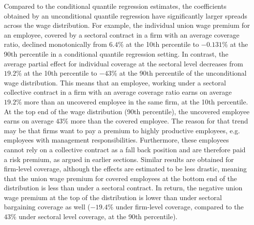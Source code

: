 Compared to the conditional quantile regression estimates, the coefficients obtained by an unconditional quantile regression have significantly larger spreads across the wage distribution. For example, the individual union wage premium for an employee, covered by a sectoral contract in a firm with an average coverage ratio, declined monotonically from $6.4\%$ at the 10th percentile to $-0.131\%$ at the 90th percentile in a conditional quantile regression setting. In contrast, the average partial effect for individual coverage at the sectoral level decreases from $19.2\%$ at the 10th percentile to $-43\%$ at the 90th percentile of the unconditional wage distribution. This means that an employee, working under a sectoral collective contract in a firm with an average coverage ratio earns on average $19.2\%$ more than an uncovered employee in the same firm, at the 10th percentile. At the top end of the wage distribution (90th percentile), the uncovered employee earns on average $43\%$ more than the covered employee. The reason for that trend may be that firms want to pay a premium to highly productive employees, e.g. employees with management responsibilities. Furthermore, these employees cannot rely on a collective contract as a fall back position and are therefore paid a risk premium, as argued in earlier sections. Similar results are obtained for firm-level coverage, although the effects are estimated to be less drastic, meaning that the union wage premium for covered employees at the bottom end of the distribution is less than under a sectoral contract. In return, the negative union wage premium at the top of the distribution is lower than under sectoral bargaining coverage as well ($-19.4\%$ under firm-level coverage, compared to the $43\%$ under sectoral level coverage, at the 90th percentile).
